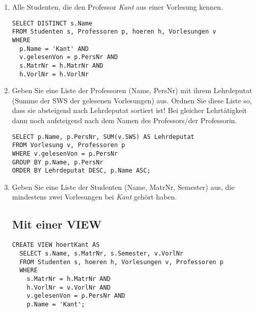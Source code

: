 \documentclass{bschlangaul-aufgabe}
\begin{document}
\begin{enumerate}


\item Alle Studenten, die den Professor \emph{Kant} aus einer Vorlesung
kennen.

\begin{bAntwort}
\begin{verbatim}
SELECT DISTINCT s.Name
FROM Studenten s, Professoren p, hoeren h, Vorlesungen v
WHERE
  p.Name = 'Kant' AND
  v.gelesenVon = p.PersNr AND
  s.MatrNr = h.MatrNr AND
  h.VorlNr = h.VorlNr
\end{verbatim}
\end{bAntwort}


\item Geben Sie eine Liste der Professoren (Name, PersNr) mit ihrem
Lehrdeputat (Summe der SWS der gelesenen Vorlesungen) aus. Ordnen Sie
diese Liste so, dass sie absteigend nach Lehrdeputat sortiert ist! Bei
gleicher Lehrtätigkeit dann noch aufsteigend nach dem Namen des
Professors/der Professorin.

\begin{bAntwort}
\begin{verbatim}
SELECT p.Name, p.PersNr, SUM(v.SWS) AS Lehrdeputat
FROM Vorlesung v, Professoren p
WHERE v.gelesenVon = p.PersNr
GROUP BY p.Name, p.PersNr
ORDER BY Lehrdeputat DESC, p.Name ASC;
\end{verbatim}
\end{bAntwort}


\item Geben Sie eine Liste der Studenten (Name, MatrNr, Semester) aus,
die mindestens zwei Vorlesungen bei \emph{Kant} gehört haben.

\begin{bAntwort}
\subsection*{Mit einer VIEW}

\begin{verbatim}
CREATE VIEW hoertKant AS
  SELECT s.Name, s.MatrNr, s.Semester, v.VorlNr
  FROM Studenten s, hoeren h, Vorlesungen v, Professoren p
  WHERE
    s.MatrNr = h.MatrNr AND
    h.VorlNr = v.VorlNr AND
    v.gelesenVon = p.PersNr AND
    p.Name = 'Kant';
\end{verbatim}


\end{bAntwort}
\end{enumerate}
\end{document}
